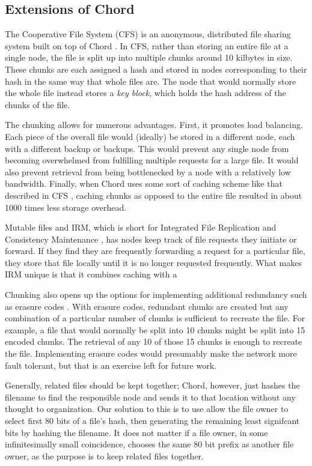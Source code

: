 \subsection{Extensions of Chord}

The Cooperative File System (CFS) is an anonymous, distributed file sharing system built on top of Chord \cite{CFS}.  In CFS, rather than storing an entire file at a single node, the file is split up into multiple chunks around 10 kilbytes in size.  These chunks are each assigned a hash and stored in nodes corresponding to their hash in the same way that whole files are.  The node that would normally store the whole file instead stores a \emph{key block}, which holds the hash address of the chunks of the file. 

The chunking allows for numerous advantages.  First, it promotes load balancing. Each piece of the overall file would (ideally) be stored in a different node, each with a different backup or backups.  This would prevent any single node from becoming overwhelmed from fulfilling multiple requests for a large file.  It would also prevent retrieval from being bottlenecked by a node with a relatively low bandwidth. Finally, when Chord uses some sort of caching scheme like that described in CFS \cite{CFS}, caching chunks as opposed to the entire file resulted in about 1000 times less storage overhead.  

Mutable files  and IRM, which is short for Integrated File Replication and Consistency Maintenance \cite{irm}, has nodes keep track of file requests they initiate or forward.  If they find they are frequently forwarding a request for a particular file, they store that file locally until it is no longer requested frequently.  What makes IRM unique is that it combines caching with a 

Chunking also opens up the options for implementing additional redundancy such as erasure codes \cite{rizzo1997effective}. With erasure codes, redundant chunks are created but any combination of a particular number of chunks is sufficient to recreate the file.  For example, a file that would normally be split into 10 chunks might be split into 15 encoded chunks.  The retrieval of any 10 of those 15 chunks is enough to recreate the file.  Implementing erasure codes would presumably make the network more fault tolerant, but that is an exercise left for future work.


Generally, related files should be kept together; Chord, however, just hashes the filename to find the responsible node and sends it to that location without any thought to organization.  Our solution to this is to use allow the file owner to select first 80 bits of a file's hash, then generating the remaining least signifcant bits by hashing the filename.  It does not matter if a file owner, in some infinitesimally small coincidence, chooses the same 80 bit prefix as another file owner, as the purpose is to keep related files together.   